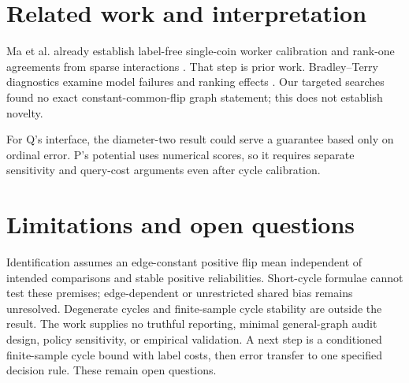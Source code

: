 \documentclass{article}
\begin{document}
\section{Related work and interpretation}
Ma et al. already establish label-free single-coin worker calibration and rank-one agreements from
sparse interactions \cite{Ma2017}. That step is prior work. Bradley--Terry diagnostics examine model
failures and ranking effects \cite{Wu2022}. Our targeted searches found no exact constant-common-flip
graph statement; this does not establish novelty. %

For Q's interface, the diameter-two result could serve a guarantee based only on ordinal error.
P's potential uses numerical scores, so it requires separate sensitivity and query-cost arguments
even after cycle calibration. %

\section{Limitations and open questions}
Identification assumes an edge-constant positive flip mean independent of intended comparisons
and stable positive reliabilities. Short-cycle formulae cannot test these premises; edge-dependent
or unrestricted shared bias remains unresolved. Degenerate cycles and finite-sample cycle
stability are outside the result. %
The work supplies no truthful reporting, minimal general-graph audit design, policy sensitivity,
or empirical validation. A next step is a conditioned finite-sample cycle bound with label costs,
then error transfer to one specified decision rule. These remain open questions. %



\end{document}

